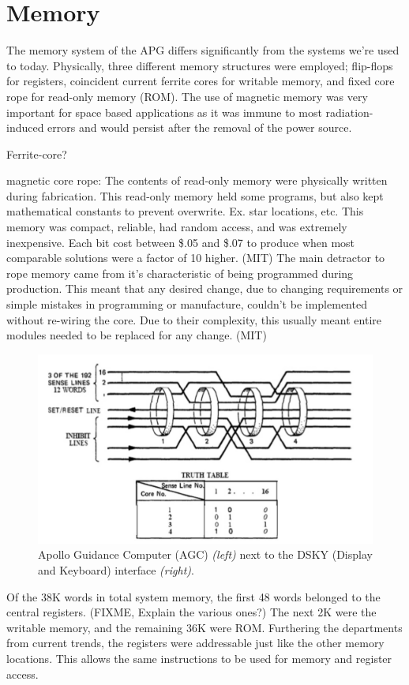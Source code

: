 \documentclass[a4paper,11pt]{article}
\begin{document}
\section{Memory}
The memory system of the APG differs significantly from the systems we're used to today.  Physically, three different memory structures were employed; flip-flops for registers, coincident current ferrite cores for writable memory, and fixed core rope for read-only memory (ROM).  The use of magnetic memory was very important for space based applications as it was immune to most radiation-induced errors and would persist after the removal of the power source.

Ferrite-core?

magnetic core rope: The contents of read-only memory were physically written during fabrication.  This read-only memory held some programs, but also kept mathematical constants to prevent overwrite.  Ex. star locations, etc.  This memory was compact, reliable, had random access, and was extremely inexpensive.  Each bit cost between \$.05 and \$.07 to produce when most comparable solutions were a factor of 10 higher. (MIT) The main detractor to rope memory came from it's characteristic of being programmed during production.  This meant that any desired change, due to changing requirements or simple mistakes in programming or manufacture, couldn't be implemented without re-wiring the core.  Due to their complexity, this usually meant entire modules needed to be replaced for any change.  (MIT)

\begin{figure}[h!]
\caption{Apollo Guidance Computer (AGC) {\it (left)} next to the DSKY (Display and Keyboard) interface {\it (right)}.} 
\centering
\includegraphics[width=.8\textwidth]{core_rope.png} 
\end{figure}
\vspace{0.02cm}

Of the 38K words in total system memory, the first 48 words belonged to the central registers.  (FIXME, Explain the various ones?)  The next 2K were the writable memory, and the remaining 36K were ROM.  Furthering the departments from current trends, the registers were addressable just like the other memory locations.  This allows the same instructions to be used for memory and register access.  
\end{document}
